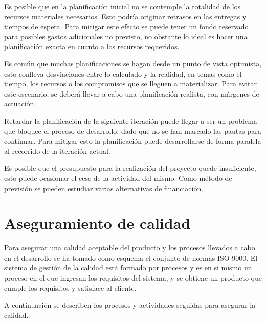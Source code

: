 Es posible que en la planificación inicial no se contemple la totalidad de los recursos materiales necesarios. Esto podría originar retrasos en las entregas y tiempos 
de espera. Para mitigar este efecto se puede tener un fondo reservado para posibles gastos adicionales no previsto, no obstante lo ideal es hacer una planificación exacta en
cuanto a los recursos requeridos. 

Es común que muchas planificaciones se hagan desde un punto de vista optimista, esto conlleva desviaciones entre lo calculado y la realidad, en temas como el tiempo, los recursos o los compromisos que se lleguen a materializar. Para evitar este escenario, se deberá llevar a cabo una planificación realista, con márgenes de actuación. 

Retardar la planificación de la siguiente iteración puede llegar a ser un problema que bloquee el proceso de desarrollo, dado que no se han marcado las pautas para 
continuar. Para mitigar esto la planificación puede desarrollarse de forma paralela al recorrido de la iteración actual. 

Es posible que el presupuesto para la realización del proyecto quede insuficiente, esto puede ocasionar el cese de la actividad del mismo. Como método de previsión se 
pueden estudiar varias alternativas de financiación.  

\section{Aseguramiento de calidad}

Para asegurar una calidad aceptable del producto y los procesos llevados a cabo en el desarrollo se ha tomado como esquema el conjunto de normas ISO 9000. 
El sistema de gestión de la calidad está formado por procesos y es en si mismo un proceso en el que ingresan los requisitos del sistema, y se obtiene un
producto que cumple los requisitos y satisface al cliente. 

A continuación se describen los procesos y actividades seguidas para asegurar la calidad.

